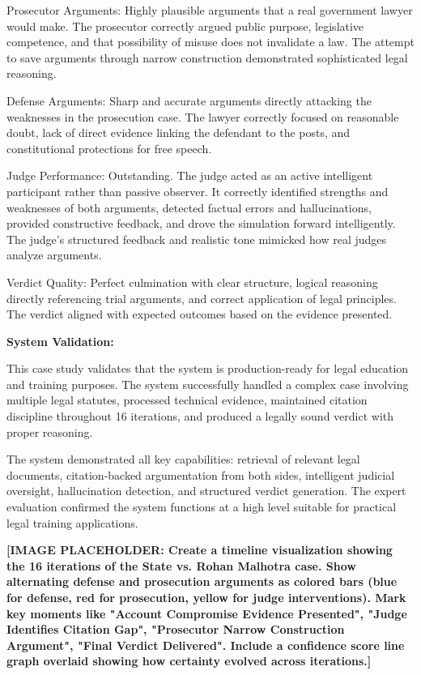 \documentclass[12pt,singleside,a4paper]{article}
\begin{document}
Prosecutor Arguments: Highly plausible arguments that a real government lawyer would make. The prosecutor correctly argued public purpose, legislative competence, and that possibility of misuse does not invalidate a law. The attempt to save arguments through narrow construction demonstrated sophisticated legal reasoning.

Defense Arguments: Sharp and accurate arguments directly attacking the weaknesses in the prosecution case. The lawyer correctly focused on reasonable doubt, lack of direct evidence linking the defendant to the posts, and constitutional protections for free speech.

Judge Performance: Outstanding. The judge acted as an active intelligent participant rather than passive observer. It correctly identified strengths and weaknesses of both arguments, detected factual errors and hallucinations, provided constructive feedback, and drove the simulation forward intelligently. The judge's structured feedback and realistic tone mimicked how real judges analyze arguments.

Verdict Quality: Perfect culmination with clear structure, logical reasoning directly referencing trial arguments, and correct application of legal principles. The verdict aligned with expected outcomes based on the evidence presented.

\textbf{System Validation:}

This case study validates that the system is production-ready for legal education and training purposes. The system successfully handled a complex case involving multiple legal statutes, processed technical evidence, maintained citation discipline throughout 16 iterations, and produced a legally sound verdict with proper reasoning.

The system demonstrated all key capabilities: retrieval of relevant legal documents, citation-backed argumentation from both sides, intelligent judicial oversight, hallucination detection, and structured verdict generation. The expert evaluation confirmed the system functions at a high level suitable for practical legal training applications.

\textbf{[IMAGE PLACEHOLDER: Create a timeline visualization showing the 16 iterations of the State vs. Rohan Malhotra case. Show alternating defense and prosecution arguments as colored bars (blue for defense, red for prosecution, yellow for judge interventions). Mark key moments like "Account Compromise Evidence Presented", "Judge Identifies Citation Gap", "Prosecutor Narrow Construction Argument", "Final Verdict Delivered". Include a confidence score line graph overlaid showing how certainty evolved across iterations.]}
\end{document}
